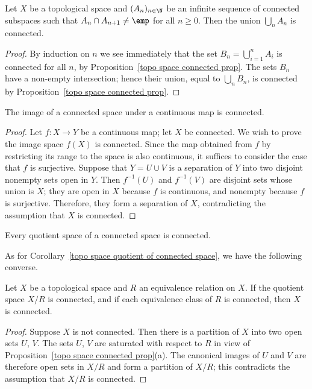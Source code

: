 \begin{corollary}
Let $X$ be a topological space and $(A_n)_{n\in\N}$ be an infinite sequence of connected subspaces such that $A_n\cap A_{n+1}\neq\emp$ for all $n\geq 0$. Then the union $\bigcup_nA_n$ is connected.
\end{corollary}
\begin{proof}
By induction on $n$ we see immediately that the set $B_n=\bigcup_{i=1}^{n}A_i$ is connected for all $n$, by Proposition~\ref{topo space connected prop}. The sets $B_n$ have a non-empty intersection; hence their union, equal to $\bigcup_nB_n$, is connected by Proposition~\ref{topo space connected prop}.
\end{proof}
\begin{proposition}\label{topo space connected continuous image}
The image of a connected space under a continuous map is connected.
\end{proposition}
\begin{proof}
Let $f:X\to Y$ be a continuous map; let $X$ be connected. We wish to prove the image space $f(X)$ is connected. Since the map obtained from $f$ by restricting its range to the space is also continuous, it suffices to consider the case that $f$ is surjective. Suppose that $Y=U\cup V$ is a separation of $Y$ into two disjoint nonempty sets open in $Y$. Then $f^{-1}(U)$ and $f^{-1}(V)$ are disjoint sets whose union is $X$; they are open in $X$ because $f$ is continuous, and nonempty because $f$ is surjective. Therefore, they form a separation of $X$, contradicting the assumption that $X$ is connected.
\end{proof}
\begin{corollary}\label{topo space quotient of connected space}
Every quotient space of a connected space is connected.
\end{corollary}
As for Corollary~\ref{topo space quotient of connected space}, we have the following converse.
\begin{proposition}\label{topo space connected if quotient is}
Let $X$ be a topological space and $R$ an equivalence relation on $X$. If the quotient space $X/R$ is connected, and if each equivalence class of $R$ is connected, then $X$ is connected.
\end{proposition}
\begin{proof}
Suppose $X$ is not connected. Then there is a partition of $X$ into two open sets $U$, $V$. The sets $U$, $V$ are saturated with respect to $R$ in view of Proposition~\ref{topo space connected prop}(a). The canonical images of $U$ and $V$ are therefore open sets in $X/R$ and form a partition of $X/R$; this contradicts the assumption that $X/R$ is connected.
\end{proof}
